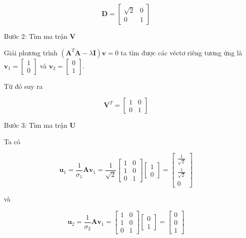 \documentclass[12pt,a4paper,oneside]{report}
\numberwithin{equation}{section}
\begin{document}
$$
\mathbf{D}=\left[\begin{array}{cc}
	\sqrt{2} & 0 \\
	0 & 1
\end{array}\right]
$$

Bước 2: Tìm ma trận $\mathbf{V}$

Giải phương trình $\left(\mathbf{A}^{T} \mathbf{A}-\lambda \mathbf{I}\right) \mathbf{v}=0$ ta tìm được các véctơ riêng tương ứng là \\
$\mathbf{v}_{1}=\left[\begin{array}{l}1 \\ 0\end{array}\right]$ và $\mathbf{v}_{2}=\left[\begin{array}{l}0 \\ 1\end{array}\right]$.

Từ đó suy ra

$$
\mathbf{V}^{T}=\left[\begin{array}{ll}
	1 & 0 \\
	0 & 1
\end{array}\right]
$$

Bước 3: Tìm ma trận $\mathbf{U}$

Ta có

$$
\mathbf{u}_{1}=\frac{1}{\sigma_{1}} \mathbf{A} \mathbf{v}_{1}=\frac{1}{\sqrt{2}}\left[\begin{array}{ll}
	1 & 0 \\
	1 & 0 \\
	0 & 1
\end{array}\right]\left[\begin{array}{l}
	1 \\
	0
\end{array}\right]=\left[\begin{array}{c}
	\frac{1}{\sqrt{2}} \\
	\frac{1}{\sqrt{2}} \\
	0
\end{array}\right]
$$

và

$$
\mathbf{u}_{2}=\frac{1}{\sigma_{2}} \mathbf{A} \mathbf{v}_{1}=\left[\begin{array}{ll}
	1 & 0 \\
	1 & 0 \\
	0 & 1
\end{array}\right]\left[\begin{array}{l}
	0 \\
	1
\end{array}\right]=\left[\begin{array}{l}
	0 \\
	0 \\
	1
\end{array}\right]
$$
\end{document}
